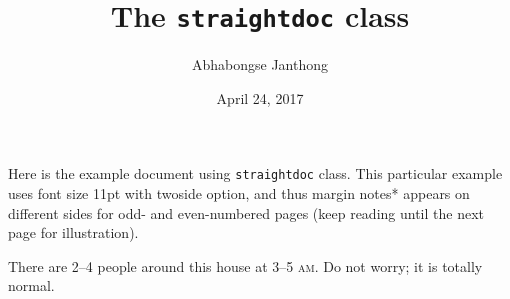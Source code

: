 \documentclass[11pt,twoside]{straightdoc}
\title{The \texttt{straightdoc} class}
\author{Abhabongse Janthong}
\date{April 24, 2017}
\begin{document}
    \maketitle

    Here is the example document using \texttt{straightdoc} class. This particular example uses font size 11pt with twoside option, and thus margin notes*  appears on different sides for odd- and even-numbered pages (keep reading until the next page for illustration).

    \lipsum[1-4]

    There are 2--4 people around this house at 3--5 \textsc{am}.  Do not worry; it is totally normal.
\end{document}
